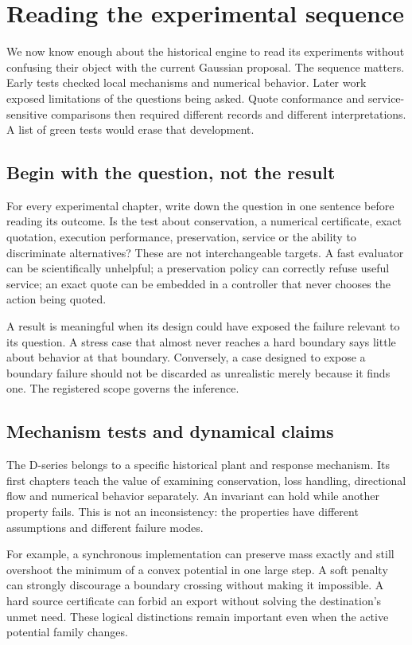 \chapter{Reading the experimental sequence}\label{ch:evidence-route}
We now know enough about the historical engine to read its experiments
without confusing their object with the current Gaussian proposal. The
sequence matters. Early tests checked local mechanisms and numerical
behavior. Later work exposed limitations of the questions being asked.
Quote conformance and service-sensitive comparisons then required different
records and different interpretations. A list of green tests would erase
that development.

\section{Begin with the question, not the result}
For every experimental chapter, write down the question in one sentence
before reading its outcome. Is the test about conservation, a numerical
certificate, exact quotation, execution performance, preservation, service
or the ability to discriminate alternatives? These are not interchangeable
targets. A fast evaluator can be scientifically unhelpful; a preservation
policy can correctly refuse useful service; an exact quote can be embedded
in a controller that never chooses the action being quoted.

A result is meaningful when its design could have exposed the failure
relevant to its question. A stress case that almost never reaches a hard
boundary says little about behavior at that boundary. Conversely, a case
designed to expose a boundary failure should not be discarded as unrealistic
merely because it finds one. The registered scope governs the inference.

\section{Mechanism tests and dynamical claims}
The D-series belongs to a specific historical plant and response mechanism.
Its first chapters teach the value of examining conservation, loss handling,
directional flow and numerical behavior separately. An invariant can hold
while another property fails. This is not an inconsistency: the properties
have different assumptions and different failure modes.

For example, a synchronous implementation can preserve mass exactly and
still overshoot the minimum of a convex potential in one large step. A
soft penalty can strongly discourage a boundary crossing without making it
impossible. A hard source certificate can forbid an export without solving
the destination's unmet need. These logical distinctions remain important
even when the active potential family changes.

